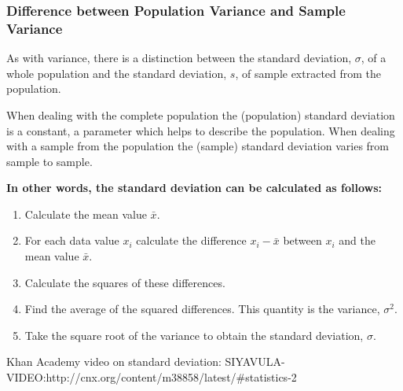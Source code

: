 \subsubsection{Difference between Population Variance and Sample Variance}
As with variance, there is a distinction between the standard deviation, $\sigma$, of a whole population and the standard deviation, $s$, of sample extracted from the population.

When dealing with the complete population the (population) standard deviation is a constant, a parameter which helps to describe the population. When dealing with a sample from the population the (sample) standard deviation varies from sample to sample. \newline

\textbf{In other words, the standard deviation can be calculated as follows:}

\begin{enumerate}
\item Calculate the mean value $\bar{x}$.
\item For each data value $x_i$ calculate the difference $x_i - \bar{x}$ between $x_i$ and the mean value $\bar{x}$.
\item Calculate the squares of these differences.
\item Find the average of the squared differences. This quantity is the variance, $\sigma^2$.
\item Take the square root of the variance to obtain the standard deviation, $\sigma$.
\end{enumerate}

Khan Academy video on standard deviation: SIYAVULA-VIDEO:http://cnx.org/content/m38858/latest/#statistics-2

